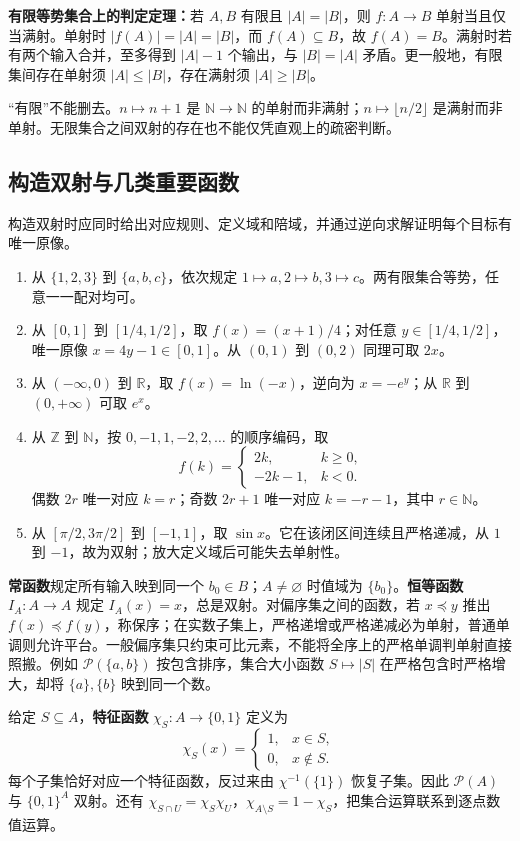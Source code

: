 \documentclass[UTF8,fontset=none,zihao=-4,a4paper]{ctexart}
\newcommand{\term}[1]{\textbf{#1}}
\begin{document}
\term{有限等势集合上的判定定理：}若 $A,B$ 有限且 $|A|=|B|$，则 $f:A\to B$ 单射当且仅当满射。单射时 $|f(A)|=|A|=|B|$，而 $f(A)\subseteq B$，故 $f(A)=B$。满射时若有两个输入合并，至多得到 $|A|-1$ 个输出，与 $|B|=|A|$ 矛盾。更一般地，有限集间存在单射须 $|A|\le|B|$，存在满射须 $|A|\ge|B|$。

“有限”不能删去。$n\mapsto n+1$ 是 $\mathbb N\to\mathbb N$ 的单射而非满射；$n\mapsto\lfloor n/2\rfloor$ 是满射而非单射。无限集合之间双射的存在也不能仅凭直观上的疏密判断。

\subsection{构造双射与几类重要函数}
构造双射时应同时给出对应规则、定义域和陪域，并通过逆向求解证明每个目标有唯一原像。
\begin{enumerate}
\item 从 $\{1,2,3\}$ 到 $\{a,b,c\}$，依次规定 $1\mapsto a,2\mapsto b,3\mapsto c$。两有限集合等势，任意一一配对均可。
\item 从 $[0,1]$ 到 $[1/4,1/2]$，取 $f(x)=(x+1)/4$；对任意 $y\in[1/4,1/2]$，唯一原像 $x=4y-1\in[0,1]$。从 $(0,1)$ 到 $(0,2)$ 同理可取 $2x$。
\item 从 $(-\infty,0)$ 到 $\mathbb R$，取 $f(x)=\ln(-x)$，逆向为 $x=-e^y$；从 $\mathbb R$ 到 $(0,+\infty)$ 可取 $e^x$。
\item 从 $\mathbb Z$ 到 $\mathbb N$，按 $0,-1,1,-2,2,\ldots$ 的顺序编码，取
\[
f(k)=\begin{cases}2k,&k\ge0,\\-2k-1,&k<0.\end{cases}
\]
偶数 $2r$ 唯一对应 $k=r$；奇数 $2r+1$ 唯一对应 $k=-r-1$，其中 $r\in\mathbb N$。
\item 从 $[\pi/2,3\pi/2]$ 到 $[-1,1]$，取 $\sin x$。它在该闭区间连续且严格递减，从 $1$ 到 $-1$，故为双射；放大定义域后可能失去单射性。
\end{enumerate}

\term{常函数}规定所有输入映到同一个 $b_0\in B$；$A\ne\varnothing$ 时值域为 $\{b_0\}$。\term{恒等函数} $I_A:A\to A$ 规定 $I_A(x)=x$，总是双射。对偏序集之间的函数，若 $x\preceq y$ 推出 $f(x)\preceq f(y)$，称保序；在实数子集上，严格递增或严格递减必为单射，普通单调则允许平台。一般偏序集只约束可比元素，不能将全序上的严格单调判单射直接照搬。例如 $\mathcal P(\{a,b\})$ 按包含排序，集合大小函数 $S\mapsto|S|$ 在严格包含时严格增大，却将 $\{a\},\{b\}$ 映到同一个数。

给定 $S\subseteq A$，\term{特征函数} $\chi_S:A\to\{0,1\}$ 定义为
\[
\chi_S(x)=\begin{cases}1,&x\in S,\\0,&x\notin S.\end{cases}
\]
每个子集恰好对应一个特征函数，反过来由 $\chi^{-1}(\{1\})$ 恢复子集。因此 $\mathcal P(A)$ 与 $\{0,1\}^A$ 双射。还有 $\chi_{S\cap U}=\chi_S\chi_U$，$\chi_{A\setminus S}=1-\chi_S$，把集合运算联系到逐点数值运算。
\end{document}
